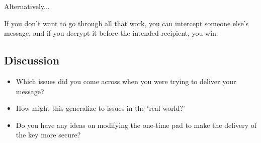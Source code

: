 \documentclass[12pt]{amsart}
\theoremstyle{plain}
\theoremstyle{definition}
\theoremstyle{remark}
\begin{document}
\begin{center}
Alternatively...
\end{center}

\noindent If you don't want to go through all that work, you can intercept someone else's message, and if you decrypt it before the intended recipient, you win.

\subsection*{Discussion}
\begin{itemize}
	\item Which issues did you come across when you were trying to deliver your message?\\
	\item How might this generalize to issues in the `real world?'\\
	\item Do you have any ideas on modifying the one-time pad to make the delivery of the key more secure?\\
\end{itemize}
\end{document}
